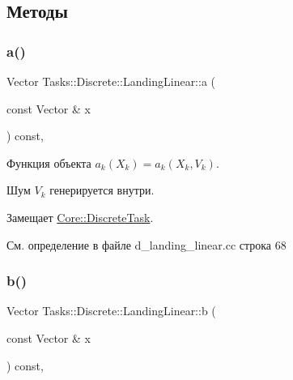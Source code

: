 \subsection{Методы}
\hypertarget{class_tasks_1_1_discrete_1_1_landing_linear_af0c0c48603fc226055ee233f93fa21fc}{}\label{class_tasks_1_1_discrete_1_1_landing_linear_af0c0c48603fc226055ee233f93fa21fc} 
\subsubsection{\texorpdfstring{a()}{a()}}
{\footnotesize\ttfamily Vector Tasks\+::\+Discrete\+::\+Landing\+Linear\+::a (\begin{DoxyParamCaption}\item[{const Vector \&}]{x }\end{DoxyParamCaption}) const\hspace{0.3cm}{\ttfamily [override]}, {\ttfamily [virtual]}}



Функция объекта $a_k(X_k) = a_k(X_k, V_k)$. 

Шум $V_k$ генерируется внутри. 

Замещает \hyperlink{class_core_1_1_discrete_task_a49d377fa365d5ec3e05962ee751f2d9e}{Core\+::\+Discrete\+Task}.



См. определение в файле d\+\_\+landing\+\_\+linear.\+cc строка 68

\hypertarget{class_tasks_1_1_discrete_1_1_landing_linear_a599d3491da6d84ba68c43433235e9980}{}\label{class_tasks_1_1_discrete_1_1_landing_linear_a599d3491da6d84ba68c43433235e9980} 
\subsubsection{\texorpdfstring{b()}{b()}}
{\footnotesize\ttfamily Vector Tasks\+::\+Discrete\+::\+Landing\+Linear\+::b (\begin{DoxyParamCaption}\item[{const Vector \&}]{x }\end{DoxyParamCaption}) const\hspace{0.3cm}{\ttfamily [override]}, {\ttfamily [virtual]}}



